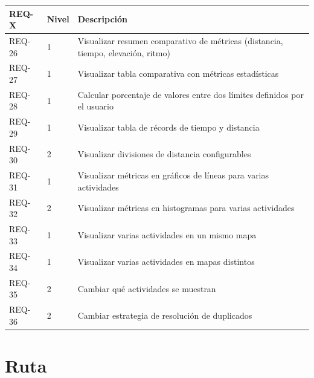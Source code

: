 \begin{longtable}{p{2cm} p{1cm} p{11cm}}
\toprule
\textbf{REQ-X} & \textbf{Nivel} & \textbf{Descripción} \\
\midrule
\endhead

REQ-26 & 1 & Visualizar resumen comparativo de métricas (distancia, tiempo, elevación, ritmo) \\
REQ-27 & 1 & Visualizar tabla comparativa con métricas estadísticas \\
REQ-28 & 1 & Calcular porcentaje de valores entre dos límites definidos por el usuario \\
REQ-29 & 1 & Visualizar tabla de récords de tiempo y distancia \\
REQ-30 & 2 & Visualizar divisiones de distancia configurables \\
REQ-31 & 1 & Visualizar métricas en gráficos de líneas para varias actividades \\
REQ-32 & 2 & Visualizar métricas en histogramas para varias actividades \\
REQ-33 & 1 & Visualizar varias actividades en un mismo mapa \\
REQ-34 & 1 & Visualizar varias actividades en mapas distintos \\
REQ-35 & 2 & Cambiar qué actividades se muestran \\
REQ-36 & 2 & Cambiar estrategia de resolución de duplicados \\

\bottomrule
\end{longtable}

\section{Ruta}

